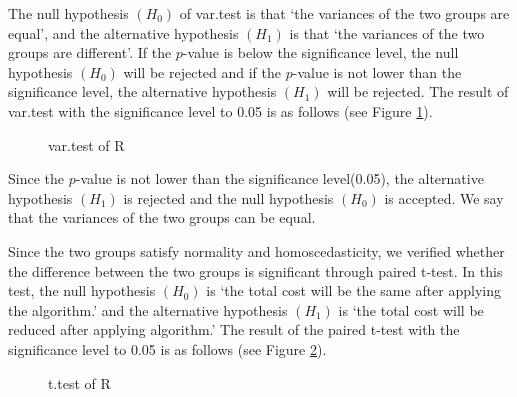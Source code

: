 \documentclass[a4paper]{amsart}
\numberwithin{equation}{section} %
\numberwithin{figure}{section} %
\numberwithin{table}{section}
\theoremstyle{plain}
\theoremstyle{definition}
\theoremstyle{plain}
\theoremstyle{plain}
\theoremstyle{plain}
\theoremstyle{plain}
\theoremstyle{plain}
\begin{document}
The null hypothesis $(H_{0})$ of var.test is that `the variances of the two groups are equal', and the alternative hypothesis $(H_{1})$ is that `the variances of the two groups are different'. 
If the $p$-value is below the significance level, the null hypothesis $(H_{0})$ will be rejected and if the $p$-value is not lower than the significance level, the alternative hypothesis $(H_{1})$ will be rejected.  The result of var.test with the significance level to 0.05 is as follows (see Figure \ref{fig:vartest}).

\begin{figure}[h!]
	\centering
	\caption{var.test of R}
	\label{fig:vartest}       %
\end{figure}

Since the $p$-value is not lower than the significance level(0.05), the alternative hypothesis $(H_{1})$ is rejected and the null hypothesis $(H_{0})$ is accepted. 
We say that the variances of the two groups can be equal.

Since the two groups satisfy normality and homoscedasticity, we verified whether the difference between the two groups is significant through paired t-test. In this test, the null hypothesis $(H_{0})$ is `the total cost will be the same after applying the algorithm.' and the alternative hypothesis $(H_{1})$ is `the total cost will be reduced after applying algorithm.' The result of the paired t-test with the significance level to 0.05 is as follows (see Figure \ref{fig:ttest}).

\begin{figure}[h!]
	\centering
	\caption{t.test of R}
	\label{fig:ttest}       %
\end{figure}
\end{document}
